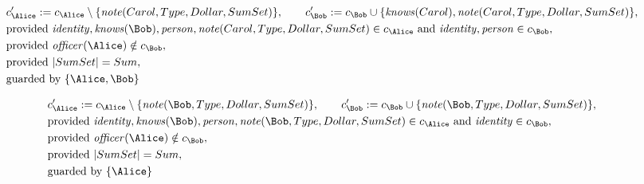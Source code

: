\begin{align*}
&
c'_
{
\Alice
}
 := 
c_
{
\Alice
}
 \setminus 
\{
\mathit{\detokenize{
note
}}
(
Carol
,
Type
,
Dollar
,
SumSet
)
\}
, \qquad 
c'_
{
\Bob
}
 := 
c_
{
\Bob
}
 \cup 
\{
\mathit{\detokenize{
knows
}}
(
Carol
)
,
\mathit{\detokenize{
note
}}
(
Carol
,
Type
,
Dollar
,
SumSet
)
\}
,\\
&
\text{provided } 
\mathit{\detokenize{
identity
}}
,
\mathit{\detokenize{
knows
}}
(
\Bob
)
,
\mathit{\detokenize{
person
}}
,
\mathit{\detokenize{
note
}}
(
Carol
,
Type
,
Dollar
,
SumSet
)
 \in c_
{
\Alice
}
 \text{ and } 
\mathit{\detokenize{
identity
}}
,
\mathit{\detokenize{
person
}}
 \in c_
{
\Bob
}
,\\
&
\text{provided } 
\mathit{\detokenize{
officer
}}
(
\Alice
)
 \notin c_
{
\Bob
}
,\\
&
\text{provided } 
|
SumSet
|
=
Sum
,\\
&
\text{guarded by } \{
\Alice
,
\Bob
\}
\end{align*}

\begin{align*}
&
c'_
{
\Alice
}
 := 
c_
{
\Alice
}
 \setminus 
\{
\mathit{\detokenize{
note
}}
(
\Bob
,
Type
,
Dollar
,
SumSet
)
\}
, \qquad 
c'_
{
\Bob
}
 := 
c_
{
\Bob
}
 \cup 
\{
\mathit{\detokenize{
note
}}
(
\Bob
,
Type
,
Dollar
,
SumSet
)
\}
,\\
&
\text{provided } 
\mathit{\detokenize{
identity
}}
,
\mathit{\detokenize{
knows
}}
(
\Bob
)
,
\mathit{\detokenize{
person
}}
,
\mathit{\detokenize{
note
}}
(
\Bob
,
Type
,
Dollar
,
SumSet
)
 \in c_
{
\Alice
}
 \text{ and } 
\mathit{\detokenize{
identity
}}
 \in c_
{
\Bob
}
,\\
&
\text{provided } 
\mathit{\detokenize{
officer
}}
(
\Alice
)
 \notin c_
{
\Bob
}
,\\
&
\text{provided } 
|
SumSet
|
=
Sum
,\\
&
\text{guarded by } \{
\Alice
\}
\end{align*}

